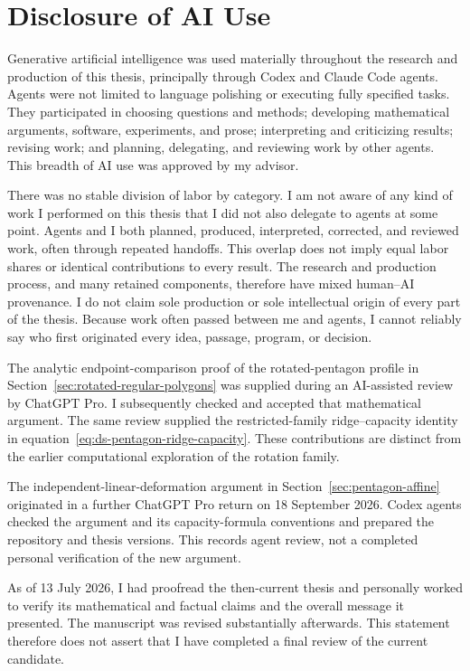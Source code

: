 \clearpage
\section*{Disclosure of AI Use}
{}

Generative artificial intelligence was used materially throughout the research
and production of this thesis, principally through Codex and Claude Code agents.
Agents were not limited to language polishing or executing fully specified
tasks.  They participated in choosing questions and methods; developing
mathematical arguments, software, experiments, and prose; interpreting and
criticizing results; revising work; and planning, delegating, and reviewing work
by other agents.  This breadth of AI use was approved by my advisor.

There was no stable division of labor by category.  I am not aware of any kind
of work I performed on this thesis that I did not also delegate to agents at
some point.  Agents and I both planned, produced, interpreted, corrected, and
reviewed work, often through repeated handoffs.  This overlap does not imply
equal labor shares or identical contributions to every result.  The research
and production process, and many retained components, therefore have mixed
human--AI provenance.  I do not claim sole production or sole intellectual
origin of every part of the thesis.  Because work often passed between me and
agents, I cannot reliably say who first originated every idea, passage,
program, or decision.

The analytic endpoint-comparison proof of the rotated-pentagon profile
in Section~\ref{sec:rotated-regular-polygons} was supplied during an
AI-assisted review by ChatGPT Pro. I subsequently checked and accepted
that mathematical argument. The same review supplied the restricted-family
ridge--capacity identity in equation~\ref{eq:ds-pentagon-ridge-capacity}.
These contributions are distinct from the earlier computational exploration
of the rotation family.

The independent-linear-deformation argument in
Section~\ref{sec:pentagon-affine} originated in a further ChatGPT Pro
return on 18 September 2026. Codex agents checked the argument and its
capacity-formula conventions and prepared the repository and thesis versions.
This records agent review, not a completed personal verification of the new
argument.

As of 13 July 2026, I had proofread the then-current thesis and personally
worked to verify its mathematical and factual claims and the overall message it
presented.  The manuscript was revised substantially afterwards.  This
statement therefore does not assert that I have completed a final review of the
current candidate.

\clearpage
